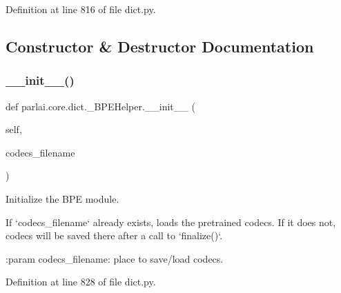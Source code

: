 Definition at line 816 of file dict.\+py.



\subsection{Constructor \& Destructor Documentation}
\mbox{\label{classparlai_1_1core_1_1dict_1_1__BPEHelper_a449da91d98a6bb75bc374782cf9f7016}} 
\subsubsection{\texorpdfstring{\+\_\+\+\_\+init\+\_\+\+\_\+()}{\_\_init\_\_()}}
{\footnotesize\ttfamily def parlai.\+core.\+dict.\+\_\+\+B\+P\+E\+Helper.\+\_\+\+\_\+init\+\_\+\+\_\+ (\begin{DoxyParamCaption}\item[{}]{self,  }\item[{}]{codecs\+\_\+filename }\end{DoxyParamCaption})}

\begin{DoxyVerb}Initialize the BPE module.

If `codecs_filename` already exists, loads the pretrained codecs.
If it does not, codecs will be saved there after a call to `finalize()`.

:param codecs_filename:
    place to save/load codecs.
\end{DoxyVerb}
 

Definition at line 828 of file dict.\+py.


